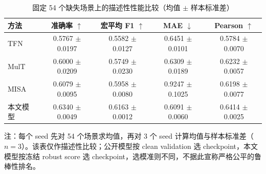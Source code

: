 \begin{table}[t]
\centering
\caption{固定 54 个缺失场景上的描述性性能比较（均值 $\pm$ 样本标准差）}
\label{tab:q2-public-baseline-missing}
\small
\begin{tabular}{lcccc}
\toprule
方法 & 准确率 $\uparrow$ & 宏平均 F1 $\uparrow$ & MAE $\downarrow$ & Pearson $\uparrow$ \\
\midrule
TFN & 0.5767 $\pm$ 0.0197 & 0.5582 $\pm$ 0.0127 & 0.6451 $\pm$ 0.0101 & 0.5784 $\pm$ 0.0070 \\
MulT & 0.6000 $\pm$ 0.0209 & 0.5749 $\pm$ 0.0230 & 0.6309 $\pm$ 0.0189 & 0.6232 $\pm$ 0.0057 \\
MISA & 0.6079 $\pm$ 0.0095 & 0.5958 $\pm$ 0.0080 & 0.9247 $\pm$ 0.1025 & 0.6198 $\pm$ 0.0077 \\
本文模型 & 0.6340 $\pm$ 0.0049 & 0.6163 $\pm$ 0.0012 & 0.6091 $\pm$ 0.0060 & 0.6414 $\pm$ 0.0025 \\
\bottomrule
\end{tabular}
\parbox{\linewidth}{\footnotesize 注：每个 seed 先对 54 个场景求均值，再对 3 个 seed 计算均值与样本标准差（$n=3$）。该表仅作描述性比较；公开模型按 clean validation 选 checkpoint，本文模型按冻结 robust score 选 checkpoint，选模准则不同，不据此宣称严格公平的鲁棒性排名。}
\end{table}
